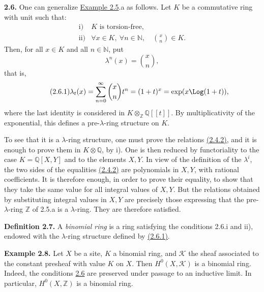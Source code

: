 \textbf{2.6.} One can generalize \hyperlink{sga6.e05.ex.2-5}{Example 2.5}.a as follows. Let \(K\) be a commutative ring with unit such that:
\[
\begin{array}{ll}
\text{i)}& K\text{ is torsion-free},\\
\text{ii)}& \forall x\in K,\ \forall n\in\mathbb N,\quad \binom{x}{n}\in K .
\end{array}
\]
Then, for all \(x\in K\) and all \(n\in\mathbb N\), put
\[
  \lambda^n(x)=\binom{x}{n},
\]
that is,
\begin{equation}\tag{2.6.1}
  \lambda_t(x)=\sum_{n=0}^{\infty}\binom{x}{n}t^n
  =(1+t)^x=\exp(x\Log(1+t)),
\end{equation}
where the last identity is considered in \(K\otimes_{\mathbb Z}\mathbb Q[[t]]\). By multiplicativity of the exponential, this defines a pre-\(\lambda\)-ring structure on \(K\).

To see that it is a \(\lambda\)-ring structure, one must prove the relations \hyperlink{sga6.e05.eq.2-4-2}{(2.4.2)}, and it is enough to prove them in \(K\otimes\mathbb Q\), by i). One is then reduced by functoriality to the case \(K=\mathbb Q[X,Y]\) and to the elements \(X,Y\). In view of the definition of the \(\lambda^i\), the two sides of the equalities \hyperlink{sga6.e05.eq.2-4-2}{(2.4.2)} are polynomials in \(X,Y\), with rational coefficients. It is therefore enough, in order to prove their equality, to show that they take the same value for all integral values of \(X,Y\). But the relations obtained by substituting integral values in \(X,Y\) are precisely those expressing that the pre-\(\lambda\)-ring \(\mathbb Z\) of 2.5.a is a \(\lambda\)-ring. They are therefore satisfied.

\textbf{Definition 2.7.} A \emph{binomial ring} is a ring satisfying the conditions 2.6.i and ii), endowed with the \(\lambda\)-ring structure defined by \hyperlink{sga6.e05.eq.2-6-1}{(2.6.1)}.

\textbf{Example 2.8.} Let \(X\) be a site, \(K\) a binomial ring, and \(\mathcal K\) the sheaf associated to the constant presheaf with value \(K\) on \(X\). Then \(H^0(X,\mathcal K)\) is a binomial ring. Indeed, the conditions \hyperlink{sga6.e05.para.2-6}{2.6} are preserved under passage to an inductive limit. In particular, \(H^0(X,\mathbb Z)\) is a binomial ring.

